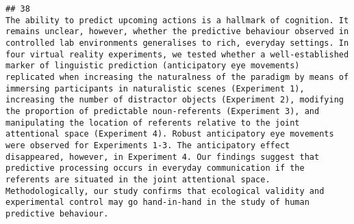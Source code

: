 \documentclass[
  english,
  man]{apa6}
\begin{document}
\begin{verbatim}
## 38                                                                                                                                                                                                                                                                                                                                                                                                                                                                                                                                                                                                                                                                                                                                                                                                                                                                                                                                                                                                                                                                                                                                                                                                                                                                                                                                                                                                                                                                                             The ability to predict upcoming actions is a hallmark of cognition. It remains unclear, however, whether the predictive behaviour observed in controlled lab environments generalises to rich, everyday settings. In four virtual reality experiments, we tested whether a well-established marker of linguistic prediction (anticipatory eye movements) replicated when increasing the naturalness of the paradigm by means of immersing participants in naturalistic scenes (Experiment 1), increasing the number of distractor objects (Experiment 2), modifying the proportion of predictable noun-referents (Experiment 3), and manipulating the location of referents relative to the joint attentional space (Experiment 4). Robust anticipatory eye movements were observed for Experiments 1-3. The anticipatory effect disappeared, however, in Experiment 4. Our findings suggest that predictive processing occurs in everyday communication if the referents are situated in the joint attentional space. Methodologically, our study confirms that ecological validity and experimental control may go hand-in-hand in the study of human predictive behaviour.

\end{verbatim}
\end{document}
